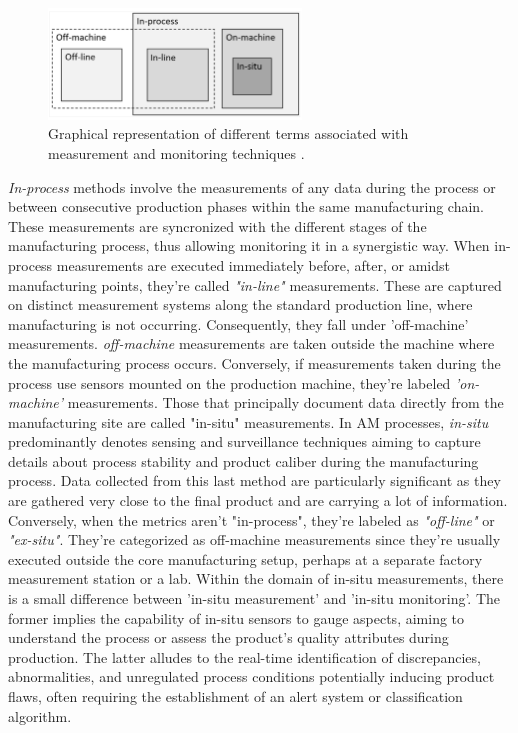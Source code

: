 \begin{figure}
    \centering
    \includegraphics[width=0.6\textwidth]{Images/dovevai.png}
    \caption[Measurement and monitoring techniques.]{Graphical representation of different terms associated with measurement and monitoring techniques \cite{richard_leach_integrated_2020}.}
    \label{fig:dovevai}
\end{figure}
\emph{In-process} methods involve the measurements of any data during the process or between consecutive production phases within the same manufacturing chain. These measurements are syncronized with the different stages of the manufacturing process, thus allowing monitoring it in a synergistic way. When in-process measurements are executed immediately before, after, or amidst manufacturing points, they're called \emph{"in-line"} measurements. These are captured on distinct measurement systems along the standard production line, where manufacturing is not occurring. Consequently, they fall under 'off-machine' measurements. \emph{off-machine} measurements are taken outside the machine where the manufacturing process occurs. Conversely, if measurements taken during the process use sensors mounted on the production machine, they're labeled \emph{'on-machine'} measurements. Those that principally document data directly from the manufacturing site are called "in-situ" measurements. In AM processes, \emph{in-situ} predominantly denotes sensing and surveillance techniques aiming to capture details about process stability and product caliber during the manufacturing process. Data collected from this last method are particularly significant as they are gathered very close to the final product and are carrying a lot of information. Conversely, when the metrics aren't "in-process", they're labeled as \emph{"off-line"} or \emph{"ex-situ"}. They're categorized as off-machine measurements since they're usually executed outside the core manufacturing setup, perhaps at a separate factory measurement station or a lab. Within the domain of in-situ measurements, there is a small difference between 'in-situ measurement' and 'in-situ monitoring'. The former implies the capability of in-situ sensors to gauge aspects, aiming to understand the process or assess the product's quality attributes during production. The latter alludes to the real-time identification of discrepancies, abnormalities, and unregulated process conditions potentially inducing product flaws, often requiring the establishment of an alert system or classification algorithm. 
